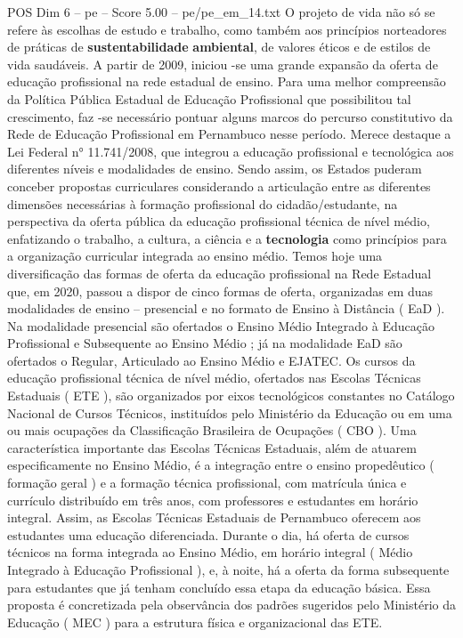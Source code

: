 \begin{textsample}{POS Dim 6 – pe – Score 5.00 – pe/pe\_em\_14.txt}
O projeto de vida não só se refere às escolhas de estudo e trabalho, como também aos princípios norteadores de práticas de \textbf{sustentabilidade} \textbf{ambiental}, de valores éticos e de estilos de vida saudáveis.
A partir de 2009, iniciou -se uma grande expansão da oferta de educação profissional na rede estadual de ensino.
Para uma melhor compreensão da Política Pública Estadual de Educação Profissional que possibilitou tal crescimento, faz -se necessário pontuar alguns marcos do percurso constitutivo da Rede de Educação Profissional em Pernambuco nesse período.
Merece destaque a Lei Federal n{\EmojiFont °} 11.741/2008, que integrou a educação profissional e tecnológica aos diferentes níveis e modalidades de ensino.
Sendo assim, os Estados puderam conceber propostas curriculares considerando a articulação entre as diferentes dimensões necessárias à formação profissional do cidadão/estudante, na perspectiva da oferta pública da educação profissional técnica de nível médio, enfatizando o trabalho, a cultura, a ciência e a \textbf{tecnologia} como princípios para a organização curricular integrada ao ensino médio.
Temos hoje uma diversificação das formas de oferta da educação profissional na Rede Estadual que, em 2020, passou a dispor de cinco formas de oferta, organizadas em duas modalidades de ensino – presencial e no formato de Ensino à Distância ( EaD ).
Na modalidade presencial são ofertados o Ensino Médio Integrado à Educação Profissional e Subsequente ao Ensino Médio ; já na modalidade EaD são ofertados o Regular, Articulado ao Ensino Médio e EJATEC.
Os cursos da educação profissional técnica de nível médio, ofertados nas Escolas Técnicas Estaduais ( ETE ), são organizados por eixos tecnológicos constantes no Catálogo Nacional de Cursos Técnicos, instituídos pelo Ministério da Educação ou em uma ou mais ocupações da Classificação Brasileira de Ocupações ( CBO ).
Uma característica importante das Escolas Técnicas Estaduais, além de atuarem especificamente no Ensino Médio, é a integração entre o ensino propedêutico ( formação geral ) e a formação técnica profissional, com matrícula única e currículo distribuído em três anos, com professores e estudantes em horário integral.
Assim, as Escolas Técnicas Estaduais de Pernambuco oferecem aos estudantes uma educação diferenciada.
Durante o dia, há oferta de cursos técnicos na forma integrada ao Ensino Médio, em horário integral ( Médio Integrado à Educação Profissional ), e, à noite, há a oferta da forma subsequente para estudantes que já tenham concluído essa etapa da educação básica.
Essa proposta é concretizada pela observância dos padrões sugeridos pelo Ministério da Educação ( MEC ) para a estrutura física e organizacional das ETE.

\end{textsample}
